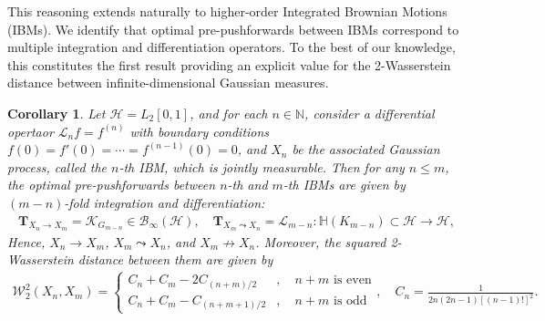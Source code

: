 \documentclass[noinfoline]{imsart}\setcounter{tocdepth}{2}
\renewcommand{\b}[1]{\mathbb{#1}} %
\newcommand{\m}[1]{\mathbf{#1}} %
\newcommand{\s}[1]{\mathscr{#1}} %
\renewcommand{\c}[1]{\mathcal{#1}} %
\theoremstyle{plain}
\newtheorem{corollary}[theorem]{Corollary}
\begin{document}
This reasoning extends naturally to higher-order Integrated Brownian Motions (IBMs). We identify that optimal pre-pushforwards between IBMs correspond to multiple integration and differentiation operators. To the best of our knowledge, this constitutes the first result providing an explicit value for the 2-Wasserstein distance between infinite-dimensional Gaussian measures.


\begin{corollary}\label{cor:IBM:prepush}
Let $\c{H} = L_{2}[0,1]$, and for each $n \in \b{N}$, consider a differential opertaor $\s{L}_{n} f = f ^{(n)}$ with boundary conditions $f(0) = f'(0) = \cdots = f^{(n-1)}(0) = 0$, and $X_{n}$ be the associated Gaussian process, called the $n$-th IBM, which is jointly measurable. 
Then for any $n \le m$, the optimal pre-pushforwards between $n$-th and $m$-th IBMs are given by $(m-n)$-fold integration and differentiation:
\begin{align*}
    \m{T}_{X_{n} \to X_{m}} = \s{K}_{G_{m-n}} \in \c{B}_{\infty}(\c{H}), \quad
    \m{T}_{X_{m} \leadsto X_{n}} = \s{L}_{m-n}: \b{H}(K_{m-n}) \subset \c{H} \rightarrow \c{H},
\end{align*}
Hence, $X_{n} \to X_{m}$, $X_{m} \leadsto X_{n}$, and $X_{m} \nrightarrow X_{n}$. Moreover, the squared 2-Wasserstein distance between them are given by
\begin{align*}
    \c{W}_{2}^{2}(X_{n}, X_{m}) = 
    \begin{cases}
        C_{n} + C_{m} - 2 C_{(n+m)/2} &, \quad n+m \text{ is even} \\
        C_{n} + C_{m} - C_{(n+m+1)/2} &, \quad n+m \text{ is odd}
    \end{cases}, \quad C_{n} = \frac{1}{2n(2n-1)[(n-1)!]^{2}}. 
\end{align*}
\end{corollary}
\end{document}
